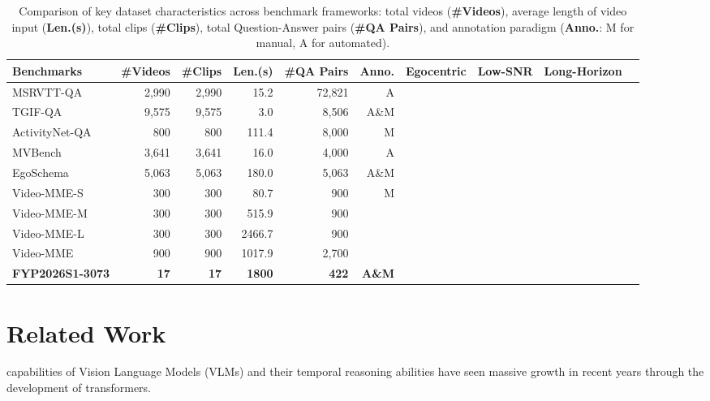 \documentclass[journal]{IEEEtran}
\newcommand{\cmark}{\ding{51}}
\newcommand{\xmark}{\ding{55}}
\begin{document}
\begin{table}[t]
\centering
\begin{tabular}{lrrrrrcccc}
\toprule
\textbf{Benchmarks} & \textbf{\#Videos} & \textbf{\#Clips} & \textbf{Len.(s)} & \textbf{\#QA Pairs} & \textbf{Anno.} & \textbf{Egocentric} & \textbf{Low-SNR} & \textbf{Long-Horizon} \\
\midrule
MSRVTT-QA \cite{msrvtt} & 2,990 & 2,990 & 15.2 & 72,821 & A  & \xmark & \cmark & \xmark \\
TGIF-QA \cite{tgif} & 9,575 & 9,575 & 3.0 & 8,506 & A\&M & \xmark & \cmark & \xmark \\
ActivityNet-QA \cite{activitynetqa} & 800 & 800 & 111.4 & 8,000 & M  & \xmark & \xmark & \xmark \\
\midrule
MVBench \cite{mvbench} & 3,641 & 3,641 & 16.0 & 4,000 & A  & \xmark & \cmark & \xmark \\
EgoSchema \cite{egoschema} & 5,063 & 5,063 & 180.0 & 5,063 & A\&M  & \xmark & \xmark & \xmark \\
\midrule
Video-MME-S & 300 & 300 & 80.7 & 900 & \multirow{4}{*}{M}   & \cmark & \cmark & \cmark \\
Video-MME-M & 300 & 300 & 515.9 & 900 & & \cmark & \cmark & \cmark \\
Video-MME-L & 300 & 300 & 2466.7 & 900  & & \cmark & \cmark & \cmark \\
Video-MME \cite{videomme} & 900 & 900 & 1017.9 & 2,700 & & \cmark & \cmark & \cmark \\
\midrule
\textbf{FYP2026S1-3073} & \textbf{17} & \textbf{17} & \textbf{1800} & \textbf{422} & \textbf{A\&M} & \textbf{\cmark} & \textbf{\cmark} & \textbf{\cmark} \\
\bottomrule
\end{tabular}
\vspace{1ex}
\caption{Comparison of key dataset characteristics across benchmark frameworks: total videos (\textbf{\#Videos}), average length of video input (\textbf{Len.(s)}), total clips (\textbf{\#Clips}), total Question-Answer pairs (\textbf{\#QA Pairs}), and annotation paradigm (\textbf{Anno.}: M for manual, A for automated).}
\label{tab:benchmark_comparison}
\end{table}

\section{Related Work}
 capabilities of Vision Language Models (VLMs) and their temporal reasoning abilities have seen massive growth in recent years through the development of transformers. 
\end{document}
